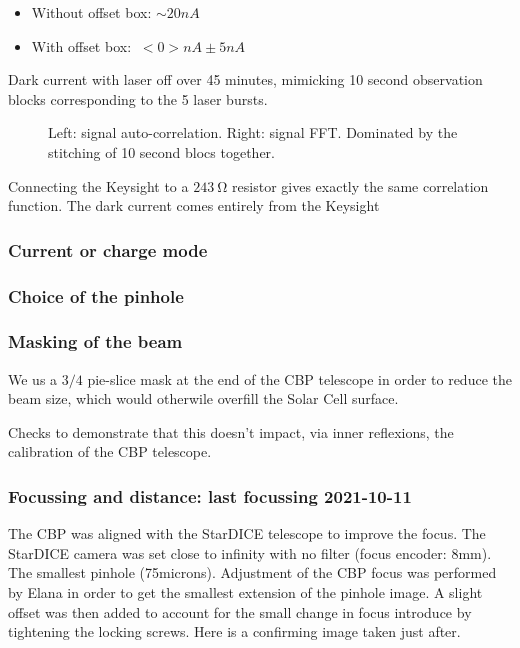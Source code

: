 \documentclass[onecolumn]{aa}
\begin{document}
\begin{itemize}
\item Without offset box: $\sim 20 nA$
\item With offset box: $~ <0> nA \pm 5 nA$
\end{itemize}


Dark current with laser off over 45 minutes, mimicking 10 second observation
blocks corresponding to the 5 laser bursts.
\begin{figure}[!ht]
\begin{center}
\end{center}
\caption[]{Left: signal auto-correlation. Right: signal FFT. Dominated by the
  stitching of 10 second blocs together.}
\label{fig:darkcurrentspectrum}
\end{figure}

Connecting the Keysight to a $\SI{243}{\ohm}$ resistor gives exactly the same
correlation function. The dark current comes entirely from the Keysight


\subsubsection{Current or charge mode}

\subsubsection{Choice of the pinhole}

\subsubsection{Masking of the beam}
We us a $3/4$ pie-slice mask at the end of the CBP telescope in order to reduce
the beam size, which would otherwile overfill the Solar Cell surface.

Checks to demonstrate that this doesn't impact, via inner reflexions, the
calibration of the CBP telescope.

\subsubsection{Focussing and distance: last focussing 2021-10-11}
The CBP was aligned with the StarDICE telescope to improve the focus. The
StarDICE camera was set close to infinity with no filter (focus encoder:
8mm). The smallest pinhole (75microns). Adjustment of the CBP focus was
performed by Elana in order to get the smallest extension of the pinhole
image. A slight offset was then added to account for the small change in focus
introduce by tightening the locking screws. Here is a confirming image taken
just after.
\end{document}
